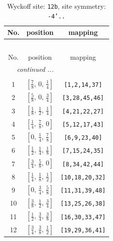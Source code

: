 \documentclass[fleqn,8pt]{jsarticle}
\begin{document}
\renewcommand{\arraystretch}{1.2}
\begin{longtable}{ccc}
\caption{Wyckoff site: {\tt 12b}, site symmetry: {\tt -4'..}}
 \\
 \hline \hline
No. & position & mapping \\ \hline \endfirsthead

\multicolumn{2}{l}{\tablename\ \thetable{}} \\
 \hline \hline
No. & position & mapping \\ \hline \endhead

 \hline \hline
\multicolumn{2}{r}{\footnotesize\it continued ...} \\ \endfoot

 \hline \hline
\multicolumn{2}{r}{} \\ \endlastfoot

1 & $\left[ \frac{7}{8},\, 0,\, \frac{1}{4} \right]$ & {\tt [1,2,14,37]} \\ \hline
2 & $\left[ \frac{5}{8},\, 0,\, \frac{3}{4} \right]$ & {\tt [3,28,45,46]} \\ \hline
3 & $\left[ \frac{1}{8},\, \frac{1}{2},\, \frac{1}{4} \right]$ & {\tt [4,21,22,27]} \\ \hline
4 & $\left[ \frac{1}{4},\, \frac{7}{8},\, 0 \right]$ & {\tt [5,12,17,43]} \\ \hline
5 & $\left[ 0,\, \frac{1}{4},\, \frac{7}{8} \right]$ & {\tt [6,9,23,40]} \\ \hline
6 & $\left[ \frac{1}{2},\, \frac{1}{4},\, \frac{1}{8} \right]$ & {\tt [7,15,24,35]} \\ \hline
7 & $\left[ \frac{3}{4},\, \frac{5}{8},\, 0 \right]$ & {\tt [8,34,42,44]} \\ \hline
8 & $\left[ \frac{1}{4},\, \frac{1}{8},\, \frac{1}{2} \right]$ & {\tt [10,18,20,32]} \\ \hline
9 & $\left[ 0,\, \frac{3}{4},\, \frac{5}{8} \right]$ & {\tt [11,31,39,48]} \\ \hline
10 & $\left[ \frac{3}{8},\, \frac{1}{2},\, \frac{3}{4} \right]$ & {\tt [13,25,26,38]} \\ \hline
11 & $\left[ \frac{1}{2},\, \frac{3}{4},\, \frac{3}{8} \right]$ & {\tt [16,30,33,47]} \\ \hline
12 & $\left[ \frac{3}{4},\, \frac{3}{8},\, \frac{1}{2} \right]$ & {\tt [19,29,36,41]} \\
\end{longtable}
\renewcommand{\arraystretch}{1.2}
\end{document}
